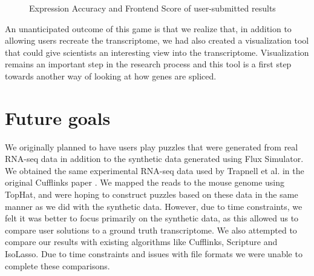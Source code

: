 \documentclass[12pt]{article}
\begin{document}
\begin{figure}[H]
\centering
{}
\caption{Expression Accuracy and Frontend Score of user-submitted results}\label{fig:score}
\end{figure}

An unanticipated outcome of this game is that we realize that, in addition to allowing users recreate the transcriptome, we had also created a visualization tool that could give scientists an interesting view into the transcriptome. Visualization remains an important step in the research process and this tool is a first step towards another way of looking at how genes are spliced.

\section*{Future goals}

We originally planned to have users play puzzles that were generated from real RNA-seq data in addition to the synthetic data generated using Flux Simulator.
We obtained the same experimental RNA-seq data used by Trapnell et al. in the original Cufflinks paper \citep{trapnell2010transcript}. We mapped the reads to 
the mouse genome using TopHat, and were hoping to construct puzzles based on these data in the same manner as we did with the synthetic data. However, due
to time constraints, we felt it was better to focus primarily on the synthetic data, as this allowed us to compare user solutions to a ground truth transcriptome. We also attempted to compare our results with existing algorithms like Cufflinks, Scripture and IsoLasso. Due to time constraints and issues with file formats we were unable to complete these comparisons.
\end{document}

